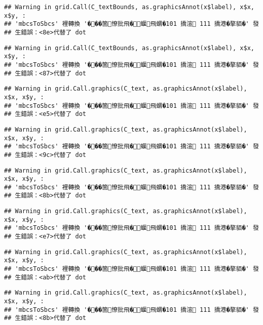 \documentclass[
]{article}
\begin{document}
\begin{verbatim}
## Warning in grid.Call(C_textBounds, as.graphicsAnnot(x$label), x$x, x$y, :
## 'mbcsToSbcs' 裡轉換 '���箇憭批飛�蝘飛蝟�101 撟渲 111 撟港�摮貊�' 發
## 生錯誤：<8e>代替了 dot
\end{verbatim}

\begin{verbatim}
## Warning in grid.Call(C_textBounds, as.graphicsAnnot(x$label), x$x, x$y, :
## 'mbcsToSbcs' 裡轉換 '���箇憭批飛�蝘飛蝟�101 撟渲 111 撟港�摮貊�' 發
## 生錯誤：<87>代替了 dot
\end{verbatim}

\begin{verbatim}
## Warning in grid.Call.graphics(C_text, as.graphicsAnnot(x$label), x$x, x$y, :
## 'mbcsToSbcs' 裡轉換 '���箇憭批飛�蝘飛蝟�101 撟渲 111 撟港�摮貊�' 發
## 生錯誤：<e5>代替了 dot
\end{verbatim}

\begin{verbatim}
## Warning in grid.Call.graphics(C_text, as.graphicsAnnot(x$label), x$x, x$y, :
## 'mbcsToSbcs' 裡轉換 '���箇憭批飛�蝘飛蝟�101 撟渲 111 撟港�摮貊�' 發
## 生錯誤：<9c>代替了 dot
\end{verbatim}

\begin{verbatim}
## Warning in grid.Call.graphics(C_text, as.graphicsAnnot(x$label), x$x, x$y, :
## 'mbcsToSbcs' 裡轉換 '���箇憭批飛�蝘飛蝟�101 撟渲 111 撟港�摮貊�' 發
## 生錯誤：<8b>代替了 dot
\end{verbatim}

\begin{verbatim}
## Warning in grid.Call.graphics(C_text, as.graphicsAnnot(x$label), x$x, x$y, :
## 'mbcsToSbcs' 裡轉換 '���箇憭批飛�蝘飛蝟�101 撟渲 111 撟港�摮貊�' 發
## 生錯誤：<e7>代替了 dot
\end{verbatim}

\begin{verbatim}
## Warning in grid.Call.graphics(C_text, as.graphicsAnnot(x$label), x$x, x$y, :
## 'mbcsToSbcs' 裡轉換 '���箇憭批飛�蝘飛蝟�101 撟渲 111 撟港�摮貊�' 發
## 生錯誤：<ab>代替了 dot
\end{verbatim}

\begin{verbatim}
## Warning in grid.Call.graphics(C_text, as.graphicsAnnot(x$label), x$x, x$y, :
## 'mbcsToSbcs' 裡轉換 '���箇憭批飛�蝘飛蝟�101 撟渲 111 撟港�摮貊�' 發
## 生錯誤：<8b>代替了 dot
\end{verbatim}
\end{document}

